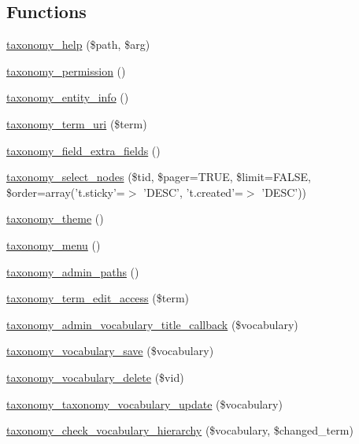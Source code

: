 \subsection*{Functions}
\begin{DoxyCompactItemize}
\item 
\hyperlink{taxonomy_8module_a1c40d35aac1b45d9be1f2155aba15557}{taxonomy\_\-help} (\$path, \$arg)
\item 
\hyperlink{taxonomy_8module_a700f0b6c1619798c550d5ffffbd25a35}{taxonomy\_\-permission} ()
\item 
\hyperlink{taxonomy_8module_a581b0fd37814f5576b28e4bb340154bb}{taxonomy\_\-entity\_\-info} ()
\item 
\hyperlink{taxonomy_8module_a2d13c9b5d7e0c1d4b3b9b4f25cd6ebba}{taxonomy\_\-term\_\-uri} (\$term)
\item 
\hyperlink{taxonomy_8module_a02fe8c1af0b3d6d760d0ae077d3ec805}{taxonomy\_\-field\_\-extra\_\-fields} ()
\item 
\hyperlink{taxonomy_8module_af8fa429d60d3978bce025539b018b95f}{taxonomy\_\-select\_\-nodes} (\$tid, \$pager=TRUE, \$limit=FALSE, \$order=array('t.sticky'=$>$ 'DESC', 't.created'=$>$ 'DESC'))
\item 
\hyperlink{taxonomy_8module_a42c8d5509dd32ca172d284e95f1cf125}{taxonomy\_\-theme} ()
\item 
\hyperlink{taxonomy_8module_a256fff9f5fb7e3f68d2cb9e82d35b68c}{taxonomy\_\-menu} ()
\item 
\hyperlink{taxonomy_8module_ad82ed1d72ca6f1c3cd42884af95c0d46}{taxonomy\_\-admin\_\-paths} ()
\item 
\hyperlink{taxonomy_8module_a6fdc3ccdb297a344ec6013b4378420da}{taxonomy\_\-term\_\-edit\_\-access} (\$term)
\item 
\hyperlink{taxonomy_8module_a62328d8648894cb0a371970736ce2caf}{taxonomy\_\-admin\_\-vocabulary\_\-title\_\-callback} (\$vocabulary)
\item 
\hyperlink{taxonomy_8module_a5a68ca5e296097a5c45981a97a5c9dc6}{taxonomy\_\-vocabulary\_\-save} (\$vocabulary)
\item 
\hyperlink{taxonomy_8module_aaf15f15db5f29c1068e2e82528292543}{taxonomy\_\-vocabulary\_\-delete} (\$vid)
\item 
\hyperlink{taxonomy_8module_a14da957ce3f1c09dbccea6d2c164f81c}{taxonomy\_\-taxonomy\_\-vocabulary\_\-update} (\$vocabulary)
\item 
\hyperlink{taxonomy_8module_ab3cdfed98d0af251a848d898f47e7dd5}{taxonomy\_\-check\_\-vocabulary\_\-hierarchy} (\$vocabulary, \$changed\_\-term)

\end{DoxyCompactItemize}
